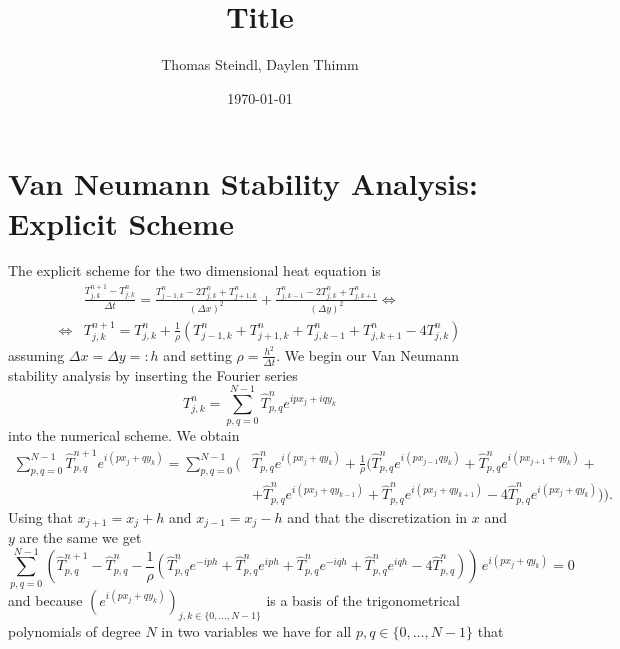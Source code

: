 \documentclass[a4aper,pagesize]{scrartcl}
\title{Title}
\date{\today}
\author{Thomas Steindl, Daylen Thimm}
\theoremstyle{definition}
\theoremstyle{plain}
\theoremstyle{remark}
\renewcommand{\hat}{\widehat}
\begin{document}
\maketitle

\section{Van Neumann Stability Analysis: Explicit Scheme}
The explicit scheme for the two dimensional heat equation is
\begin{align}
	&\frac{T_{j,k}^{n+1} - T_{j,k}^{n}}{\Delta t}
	= \frac{T_{j-1,k}^{n} - 2 T_{j,k}^{n} + T_{j+1,k}^{n}}{(\Delta x)^2}
	+ \frac{T_{j,k-1}^{n} - 2 T_{j,k}^{n} + T_{j,k+1}^{n}}{(\Delta y)^2}
\Leftrightarrow\\
\Leftrightarrow
	&T_{j,k}^{n+1}
	= T_{j,k}^{n}
	+ \frac{1}{\rho} \left(
		T_{j-1,k}^{n}
		+ T_{j+1,k}^{n}
		+ T_{j,k-1}^{n}
		+ T_{j,k+1}^{n}
		- 4 T_{j,k}^{n}
	\right)
\end{align}
assuming $\Delta x = \Delta y =: h$ and setting $\rho = \frac{h^2}{\Delta t}$. We begin our Van Neumann stability analysis by inserting the Fourier series
\begin{equation}
	T_{j,k}^n = \sum_{p,q = 0}^{N-1} \hat{T}^n_{p,q} e^{ipx_j + iqy_k}
\end{equation}
into the numerical scheme. We obtain
\begin{equation}
	\begin{split}
		\sum_{p,q = 0}^{N-1} \hat{T}^{n+1}_{p,q} e^{i(px_{j} + qy_{k})} =
		\sum_{p,q = 0}^{N-1} (
			&\hat{T}^{n}_{p,q} e^{i(px_{j} + qy_{k})} +
			\frac{1}{\rho} (
			  	  \hat{T}^{n}_{p,q} e^{i(px_{j-1} qy_{k})}
				+ \hat{T}^{n}_{p,q} e^{i(px_{j+1} + qy_{k})} + \\
			   &+ \hat{T}^{n}_{p,q} e^{i(px_{j} + qy_{k-1})}
				+ \hat{T}^{n}_{p,q} e^{i(px_{j} + qy_{k+1})}
				-  4 \hat{T}^{n}_{p,q} e^{i(px_{j} + qy_{k})}
			)
		).
	\end{split}
\end{equation}
Using that $x_{j+1} = {x_j} + h$ and $x_{j-1} = {x_j} - h$ and that the discretization in $x$ and $y$ are the same we get
\begin{equation}
	\sum_{p,q = 0}^{N-1}(
		  \hat{T}^{n+1}_{p,q}
		- \hat{T}^{n}_{p,q}
		-\frac{1}{\rho} (
			  \hat{T}^{n}_{p,q} e^{-iph}
			+ \hat{T}^{n}_{p,q} e^{iph}
		    + \hat{T}^{n}_{p,q} e^{-iqh}
			+ \hat{T}^{n}_{p,q} e^{iqh}
			-  4 \hat{T}^{n}_{p,q}
		)
	)\, e^{i(px_{j} + qy_{k})} = 0
\end{equation}
and because $(e^{i(px_{j} + qy_{k})})_{j,k \in \{0, ..., N-1\}}$ is a basis of the trigonometrical polynomials of degree $N$ in two variables we have for all $p,q \in \{0, \dots, N-1\}$ that
\end{document}

